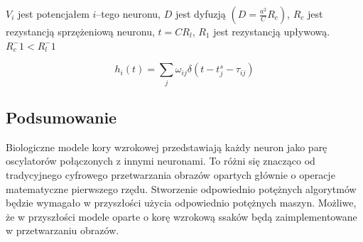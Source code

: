$V_i$ jest potencjałem $i$--tego neuronu, $D$ jest dyfuzją $(D = \frac{a^2}{C} R_c)$,
$R_c$ jest rezystancją sprzężeniową neuronu, $t= C R_l$, $R_1$ jest rezystancją upływową.
$R_c^-1<R_l^-1$

$$h_i(t)=\sum\limits_j \omega_{ij} \delta (t-t_j^s - \tau_{ij})$$
\subsection{Podsumowanie}
Biologiczne modele kory wzrokowej przedstawiają każdy neuron jako parę oscylatorów połączonych z innymi neuronami.
To różni się znacząco od tradycyjnego cyfrowego przetwarzania obrazów opartych głównie o operacje matematyczne pierwszego rzędu.
Stworzenie odpowiednio potężnych algorytmów będzie wymagało w przyszłości użycia odpowiednio potężnych maszyn.
Możliwe, że w przyszłości modele oparte o korę wzrokową ssaków będą zaimplementowane w przetwarzaniu obrazów.
